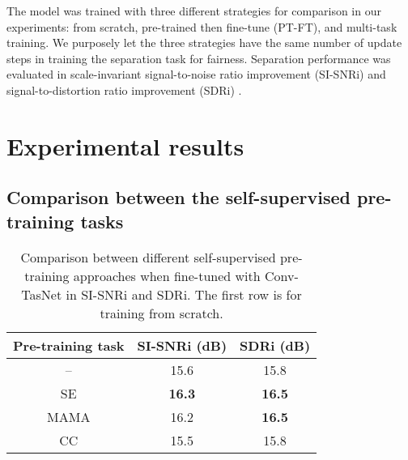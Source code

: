 \documentclass[a4paper]{article}
\begin{document}
The model was trained with three different strategies for comparison in our experiments: from scratch, pre-trained then fine-tune (PT-FT), and multi-task training.
We purposely let the three strategies have the same number of update steps in training the separation task for fairness.
Separation performance was evaluated in scale-invariant signal-to-noise ratio improvement (SI-SNRi) \cite{luo2018speaker} and signal-to-distortion ratio improvement (SDRi) \cite{vincent2006performance}.


\section{Experimental results}
\label{sec:exp}

\subsection{Comparison between the self-supervised pre-training tasks}
\label{ssec:pretraining-tasks-result}

\begin{table}[t]
    \centering
    \caption{Comparison between different self-supervised pre-training approaches when fine-tuned with Conv-TasNet in SI-SNRi and SDRi. The first row is for training from scratch.}
    \label{table:result2}
    \begin{tabular}{c|c|c} 
        \toprule
        Pre-training task & SI-SNRi (dB) & SDRi (dB) \\
        \midrule
        -- & 15.6 & 15.8 \\ 
        \midrule
        SE & \textbf{16.3} & \textbf{16.5} \\
        MAMA \cite{liu2020tera} & 16.2 & \textbf{16.5}\\
        CC \cite{baevski2020wav2vec} & 15.5 & 15.8 \\
        \bottomrule
    \end{tabular}
\vspace{-0.3cm}
\end{table}
\end{document}
